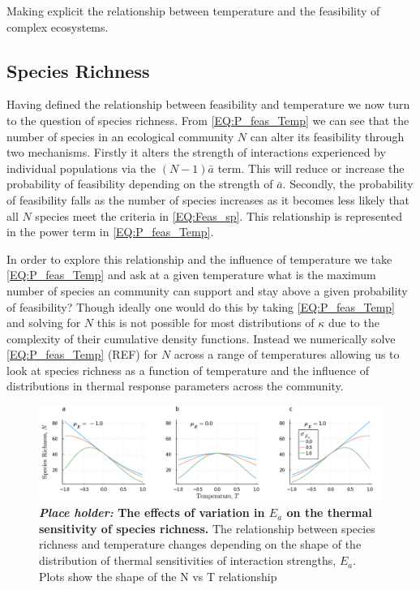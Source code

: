 \documentclass{article}
\begin{document}
Making explicit the relationship between temperature and the feasibility of complex ecosystems. 

\subsection{Species Richness} \label{SEC:N_Sp}
Having defined the relationship between feasibility and temperature we now turn to the question of species richness. From \cref{EQ:P_feas_Temp} we can see that the number of species in an ecological community $N$ can alter its feasibility through two mechanisms. Firstly it alters the strength of interactions experienced by individual populations via the $(N-1) \bar{a}$ term. This will reduce or increase the probability of feasibility depending on the strength of $\bar{a}$. Secondly, the probability of feasibility falls as the number of species increases as it becomes less likely that all $N$ species meet the criteria in \cref{EQ:Feas_sp}. This relationship is represented in the power term in \cref{EQ:P_feas_Temp}. 

In order to explore this relationship and the influence of temperature we take \cref{EQ:P_feas_Temp} and ask at a given temperature what is the maximum number of species an community can support and stay above a given probability of feasibility? Though ideally one would do this by taking \cref{EQ:P_feas_Temp} and solving for $N$ this is not possible for most distributions of $\kappa$ due to the complexity of their cumulative density functions. Instead we numerically solve \cref{EQ:P_feas_Temp} (REF) for $N$ across a range of temperatures allowing us to look at species richness as a function of temperature and the influence of distributions in thermal response parameters across the community. 

\begin{figure}
    \centering
    \includegraphics[width = \textwidth]{docs/Figures/Fig_Nsp_Temp.pdf}
    \caption{\textbf{\textit{Place holder:} The effects of variation in $E_a$ on the thermal sensitivity of species richness.} The relationship between species richness and temperature changes depending on the shape of the distribution of thermal sensitivities of interaction strengths, $E_a$. Plots show the shape of the N vs T relationship  }
    \label{fig:Nsp_Temp}
\end{figure}
\end{document}
